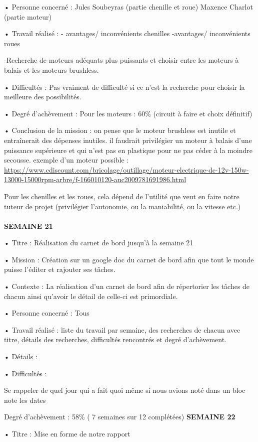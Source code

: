 \documentclass{PackagerQualityN}
\begin{document}
• Personne concerné : Jules Soubeyras (partie chenille et roue)
			 Maxence Charlot (partie moteur)
			 
• Travail réalisé : 
- avantages/ inconvénients chenilles
-avantages/ inconvénients roues

-Recherche de moteurs adéquats  plus puissants et choisir entre les moteurs à balais et les moteurs brushless.


• Difficultés :
Pas vraiment de difficulté si ce n’est la recherche pour choisir la meilleure des possibilités.

 
• Degré d’achèvement : Pour les moteurs : 60\% (circuit à faire et choix définitif)

• Conclusion de la mission : on pense que le moteur brushless est inutile et entraînerait des dépenses inutiles. il faudrait privilégier un moteur à balais d'une puissance supérieure et qui n'est pas en plastique pour ne pas céder à la moindre secousse.
exemple d’un moteur possible : \url{https://www.cdiscount.com/bricolage/outillage/moteur-electrique-dc-12v-150w-13000-15000rpm-arbre/f-166010120-auc2009781691986.html}

Pour les chenilles et les roues, cela dépend de l’utilité que veut en faire notre tuteur de projet (privilégier l’autonomie, ou la maniabilité, ou la vitesse etc.)
\\\\
\textbf{SEMAINE 21}

• Titre : Réalisation du carnet de bord jusqu’à la semaine 21

• Mission : Création sur un google doc du carnet de bord afin que tout le monde puisse l’éditer et rajouter ses tâches.

• Contexte :  La réalisation d’un carnet de bord afin de répertorier les tâches de chacun ainsi qu’avoir le détail de celle-ci est primordiale.

• Personne concerné : Tous

• Travail réalisé :
liste du travail par semaine, des recherches de chacun avec titre, détails des recherches, difficultés rencontrés et degré d'achèvement.

• Détails : 

• Difficultés :

Se rappeler de quel jour qui a fait quoi même si nous avions noté dans un bloc note les dates


Degré d’achèvement : 58\% ( 7 semaines sur 12 complétées)
\newp
\textbf{SEMAINE 22}

• Titre : Mise en forme de notre rapport
\end{document}

